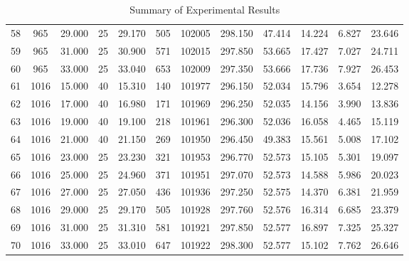 \begin{table}[H]
\begin{center}
\begin{tabular}{|cccccccccccc|}
	58 & 965 & 29.000 & 25 & 29.170 & 505 & 102005 & 298.150 & 47.414 & 14.224 & 6.827 & 23.646\\
	59 & 965 & 31.000 & 25 & 30.900 & 571 & 102015 & 297.850 & 53.665 & 17.427 & 7.027 & 24.711\\
	60 & 965 & 33.000 & 25 & 33.040 & 653 & 102009 & 297.350 & 53.666 & 17.736 & 7.927 & 26.453\\
	61 & 1016 & 15.000 & 40 & 15.310 & 140 & 101977 & 296.150 & 52.034 & 15.796 & 3.654 & 12.278\\
	62 & 1016 & 17.000 & 40 & 16.980 & 171 & 101969 & 296.250 & 52.035 & 14.156 & 3.990 & 13.836\\
	63 & 1016 & 19.000 & 40 & 19.100 & 218 & 101961 & 296.300 & 52.036 & 16.058 & 4.465 & 15.119\\
	64 & 1016 & 21.000 & 40 & 21.150 & 269 & 101950 & 296.450 & 49.383 & 15.561 & 5.008 & 17.102\\
	65 & 1016 & 23.000 & 25 & 23.230 & 321 & 101953 & 296.770 & 52.573 & 15.105 & 5.301 & 19.097\\
	66 & 1016 & 25.000 & 25 & 24.960 & 371 & 101951 & 297.070 & 52.573 & 14.588 & 5.986 & 20.023\\
	67 & 1016 & 27.000 & 25 & 27.050 & 436 & 101936 & 297.250 & 52.575 & 14.370 & 6.381 & 21.959\\
	68 & 1016 & 29.000 & 25 & 29.170 & 505 & 101928 & 297.760 & 52.576 & 16.314 & 6.685 & 23.379\\
	69 & 1016 & 31.000 & 25 & 31.310 & 581 & 101921 & 297.850 & 52.577 & 16.897 & 7.325 & 25.327\\
	70 & 1016 & 33.000 & 25 & 33.010 & 647 & 101922 & 298.300 & 52.577 & 15.102 & 7.762 & 26.646\\
	\hline
\end{tabular}
\caption{Summary of Experimental Results}
\label{table:experiment_results_summary}
\end{center}
\end{table}
